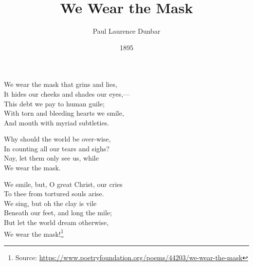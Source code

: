 \documentclass[10pt,a4paper]{article}
\newcommand{\source}[1]{\footnote{Source: \href{#1}{#1}}}
\begin{document}
\title{We Wear the Mask}
\date{1895}
\author{Paul Laurence Dunbar}
\maketitle
    
\thispagestyle{plain}
\setcounter{page}{1}
\linenumbers
We wear the mask that grins and lies,\\
It hides our cheeks and shades our eyes,—\\
This debt we pay to human guile;\\
With torn and bleeding hearts we smile,\\
And mouth with myriad subtleties.

Why should the world be over-wise,\\
In counting all our tears and sighs?\\
Nay, let them only see us, while\\
\hspace*{2em} We wear the mask.

We smile, but, O great Christ, our cries\\
To thee from tortured souls arise.\\
We sing, but oh the clay is vile\\
Beneath our feet, and long the mile;\\
But let the world dream otherwise,\\
\hspace*{2em} We wear the mask!\source{https://www.poetryfoundation.org/poems/44203/we-wear-the-mask}
\end{document}
